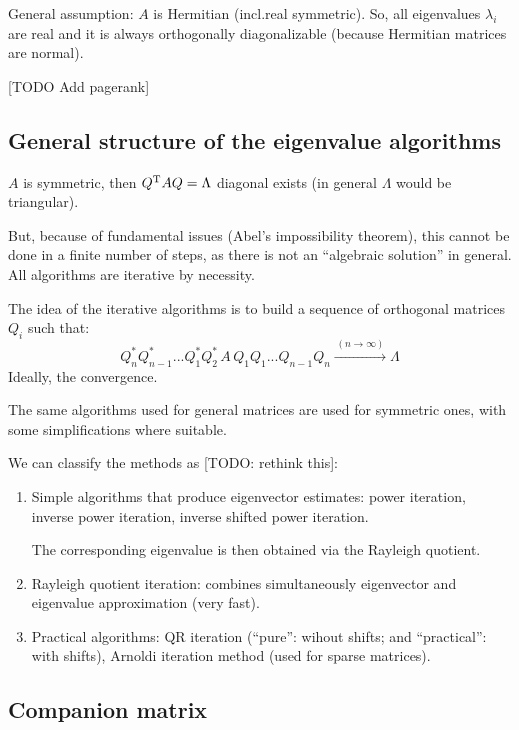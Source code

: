 \documentclass[
  12pt,
  paper=a4,
]{scrartcl} %
\begin{document}
\newpage
{}

General assumption: $A$ is Hermitian (incl.\@ real symmetric). So, all eigenvalues $\lambda_i$ are real and it is always orthogonally diagonalizable (because Hermitian matrices are normal).


[TODO Add pagerank]

\subsection*{General structure of the eigenvalue algorithms}

$A$ is symmetric, then $Q^{\mathrm{T}} A Q = \Lambda$ diagonal exists (in general $\Lambda$ would be triangular).

But, because of fundamental issues (Abel's impossibility theorem), this cannot be done in a finite number of steps, as there is not an ``algebraic solution'' in general. All algorithms are iterative by necessity.

The idea of the iterative algorithms is to build a sequence of orthogonal matrices $Q_i$ such that:
\[
Q^*_n Q^*_{n-1}...Q^*_1Q^*_2
\, A\,
Q_1 Q_1...Q_{n-1}Q_n \xrightarrow{\,(n\to\infty)\,} \Lambda
\]
Ideally, the convergence.

The same algorithms used for general matrices are used for symmetric ones, with some simplifications where suitable.

We can classify the methods as [TODO: rethink this]:
\begin{enumerate}
    \item Simple algorithms that produce eigenvector estimates: power iteration, inverse power iteration, inverse shifted power iteration.
    
    The corresponding eigenvalue is then obtained via the Rayleigh quotient.
    
    \item Rayleigh quotient iteration: combines simultaneously eigenvector and eigenvalue approximation (very fast).
    
    \item Practical algorithms: QR iteration (``pure'': wihout shifts; and ``practical'': with shifts), Arnoldi iteration method (used for sparse matrices).
\end{enumerate}


\subsection*{Companion matrix}
\end{document}
